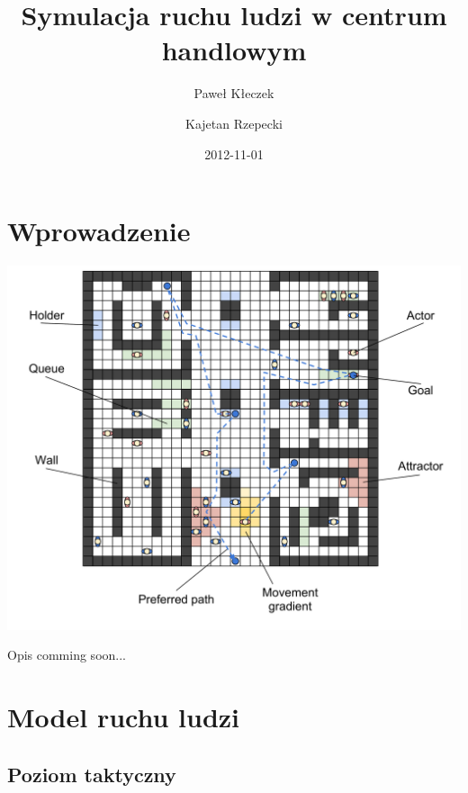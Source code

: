 \documentclass[a4paper]{article}
\title{\textbf{Symulacja ruchu ludzi w centrum handlowym}}
\author{Paweł Kłeczek \and Kajetan Rzepecki}
\date{2012-11-01}
\begin{document}
    \vspace{\fill}
    \maketitle
    \vspace{\fill}
    \thispagestyle{empty}

\newpage
    \setcounter{page}{1}
    \setcounter{tocdepth}{3}
    \tableofcontents

\newpage
    \section{Wprowadzenie}
    \label{sec-1}

    \begin{center}
        \includegraphics[scale=0.3]{./img/Overview.pdf}
    \end{center}

\noindent
Opis comming soon...

\newpage
    \section{Model ruchu ludzi}
    \label{sec-2}

        \subsection{Poziom taktyczny}
        \label{sec-2-1}
\end{document}

